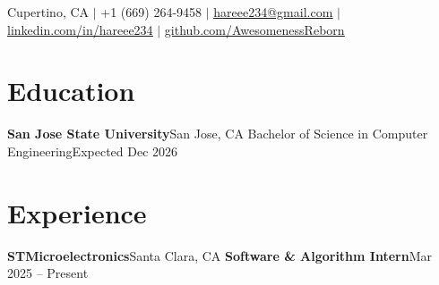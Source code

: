 \documentclass[letterpaper,11pt]{article}
\begin{document}

    \begin{center}
    \small Cupertino, CA $|$ +1 (669) 264-9458 $|$ \href{mailto:hareee234@gmail.com}{\underline{hareee234@gmail.com}} $|$ 
    \href{https://www.linkedin.com/in/hareee234/}{\underline{linkedin.com/in/hareee234}} $|$
    \href{https://github.com/AwesomenessReborn}{\underline{github.com/AwesomenessReborn}}    
\end{center}


\section{Education}
  \resumeSubHeadingListStart
    \resumeSubheading
      {\textbf{San Jose State University}}{San Jose, CA}
      {Bachelor of Science in Computer Engineering}{Expected Dec 2026}
      \resumeItemListStart
      \resumeItemListEnd
  \resumeSubHeadingListEnd

\section{Experience}
  \resumeSubHeadingListStart

    \resumeSubheading
      {\textbf{STMicroelectronics}}{Santa Clara, CA}
      {\textbf{Software \& Algorithm Intern}}{Mar 2025 -- Present}
      \resumeItemListStart

\end{document}
